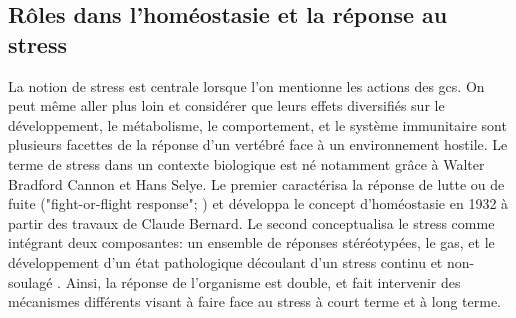 \documentclass[../main.tex]{subfiles}
\begin{document}
\subsection{Rôles dans l'homéostasie et la réponse au stress}\label{subsec:gc-role-stress}
La notion de stress est centrale lorsque l'on mentionne les actions des \glspl{gc}.
On peut même aller plus loin et considérer que leurs effets diversifiés sur le développement, le métabolisme, le comportement, et le système immunitaire sont plusieurs facettes de la réponse d'un vertébré face à un environnement hostile.
Le terme de stress dans un contexte biologique est né notamment grâce à Walter Bradford Cannon et Hans Selye.
Le premier caractérisa la réponse de lutte ou de fuite ("fight-or-flight response"; \citealp{Cannon1915}) et développa le concept d'homéostasie en 1932 à partir des travaux de Claude Bernard.
Le second conceptualisa le stress comme intégrant deux composantes:
un ensemble de réponses stéréotypées, le \gls{gas}, et le développement d'un état pathologique découlant d'un stress continu et non-soulagé \citep{Selye1946}.
Ainsi, la réponse de l'organisme est double, et fait intervenir des mécanismes différents visant à faire face au stress à court terme et à long terme.


\end{document}
